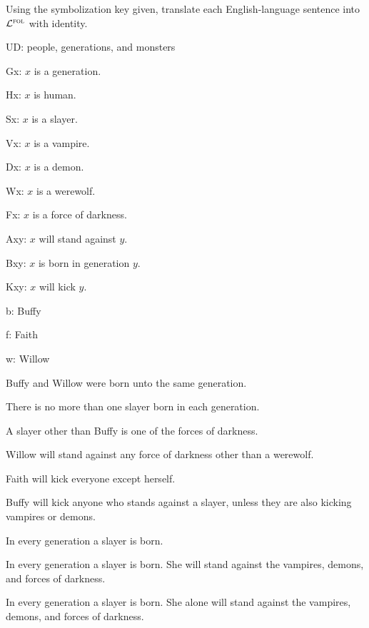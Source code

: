 \solutions
\problempart
\label{pr.$\FOL$buffy}
Using the symbolization key given, translate each English-language sentence into $\FOL$ with identity.
\begin{ekey}
\item[UD:] people, generations, and monsters
\item[Gx:] $x$ is a generation.
\item[Hx:] $x$ is human.
\item[Sx:] $x$ is a slayer.
\item[Vx:] $x$ is a vampire.
\item[Dx:] $x$ is a demon.
\item[Wx:] $x$ is a werewolf.
\item[Fx:] $x$ is a force of darkness.
\item[Axy:] $x$ will stand against $y$.
\item[Bxy:] $x$ is born in generation $y$.
\item[Kxy:] $x$ will kick $y$.
\item[b:] Buffy
\item[f:] Faith
\item[w:] Willow
\end{ekey}
\begin{earg}
\item Buffy and Willow were born unto the same generation.
\item There is no more than one slayer born in each generation.
\item A slayer other than Buffy is one of the forces of darkness.
\item Willow will stand against any force of darkness other than a werewolf.
\item Faith will kick everyone except herself.
\item Buffy will kick anyone who stands against a slayer, unless they are also kicking vampires or demons.
\item In every generation a slayer is born.
\item In every generation a slayer is born. She will stand against the vampires, demons, and forces of darkness.
\item In every generation a slayer is born. She alone will stand against the vampires, demons, and forces of darkness.
\end{earg}



